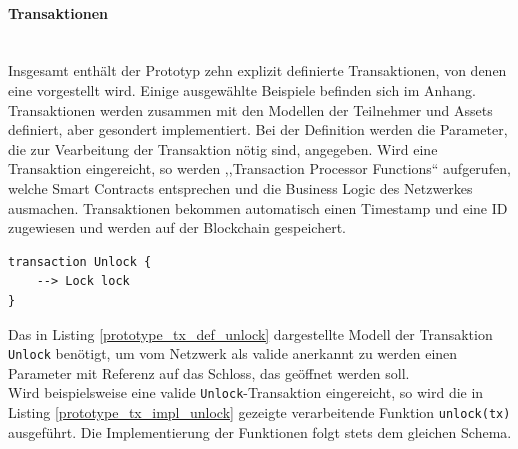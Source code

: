         \paragraph{\textrm{Transaktionen}}\hspace{0cm}\\
            Insgesamt enthält der Prototyp zehn explizit definierte Transaktionen, von denen eine vorgestellt wird. Einige ausgewählte Beispiele befinden sich im Anhang.\\
            Transaktionen werden zusammen mit den Modellen der Teilnehmer und Assets definiert, aber gesondert implementiert. 
            Bei der Definition werden die Parameter, die zur Vearbeitung der Transaktion nötig sind, angegeben. 
            Wird eine Transaktion eingereicht, so werden ,,Transaction Processor Functions`` aufgerufen, welche Smart Contracts entsprechen und die Business Logic des Netzwerkes ausmachen.
            Transaktionen bekommen automatisch einen Timestamp und eine ID zugewiesen und werden auf der Blockchain gespeichert. 
            \medskip
            \begin{lstlisting}[caption={Definition der \colorbox{light-gray}{\lstinline{Unlock}} Transaktion},label=prototype_tx_def_unlock,captionpos=b]
transaction Unlock {
    --> Lock lock
}
            \end{lstlisting}
            Das in Listing \ref{prototype_tx_def_unlock} dargestellte Modell der Transaktion \colorbox{light-gray}{\lstinline{Unlock}} benötigt, um vom Netzwerk als valide anerkannt zu werden einen Parameter mit Referenz auf das Schloss, das geöffnet werden soll.\\
            Wird beispielsweise eine valide \colorbox{light-gray}{\lstinline{Unlock}}-Transaktion eingereicht, so wird die in Listing \ref{prototype_tx_impl_unlock} gezeigte verarbeitende Funktion \colorbox{light-gray}{\lstinline{unlock(tx)}} ausgeführt. 
            Die Implementierung der Funktionen folgt stets dem gleichen Schema. 

